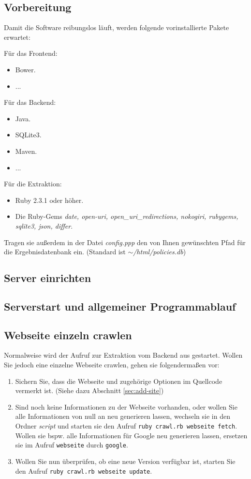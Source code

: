 \documentclass{article}
\begin{document}
	\subsection{Vorbereitung}
	Damit die Software reibungslos läuft, werden folgende vorinstallierte Pakete erwartet:
	
	Für das Frontend:
	\begin{itemize}
		\item Bower.
		\item ...
	\end{itemize}

	Für das Backend:
	\begin{itemize}
		\item Java.
		\item SQLite3.
		\item Maven.
		\item ...
	\end{itemize}

	Für die Extraktion:
	\begin{itemize}
		\item Ruby 2.3.1 oder höher.
		\item Die Ruby-Gems \textit{date, open-uri, open\_uri\_redirections, nokogiri, rubygems, sqlite3, json, differ}.
	\end{itemize}

	Tragen sie außerdem in der Datei \textit{config.ppp} den von Ihnen gewünschten Pfad für die Ergebnisdatenbank ein. (Standard ist \textit{$\sim$/html/policies.db}) 
	\subsection{Server einrichten}
	\subsection{Serverstart und allgemeiner Programmablauf}
	\subsection{Webseite einzeln crawlen}
	Normalweise wird der Aufruf zur Extraktion vom Backend aus gestartet. Wollen Sie jedoch eine einzelne Webseite crawlen, gehen sie folgendermaßen vor:
	\begin{enumerate}
		\item Sichern Sie, dass die Webseite und zugehörige Optionen im Quellcode vermerkt ist. (Siehe dazu Abschnitt \ref{sec:add-site})
		\item Sind noch keine Informationen zu der Webseite vorhanden, oder wollen Sie alle Informationen von null an neu generieren lassen, wechseln sie in den Ordner \textit{script} und starten sie den Aufruf \texttt{ruby crawl.rb webseite fetch}. Wollen sie bspw. alle Informationen für Google neu generieren lassen, ersetzen sie im Aufruf \texttt{webseite} durch \texttt{google}.
		\item Wollen Sie nun überprüfen, ob eine neue Version verfügbar ist, starten Sie den Aufruf \texttt{ruby crawl.rb webseite update}.
	\end{enumerate}
	
\end{document}
